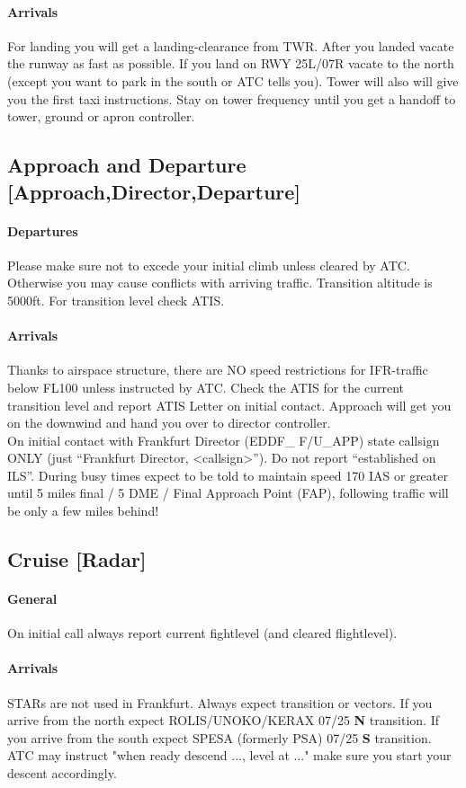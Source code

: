 \paragraph{Arrivals}
For landing you will get a landing-clearance from TWR.
After you landed vacate the runway as fast as possible.
If you land on RWY 25L/07R vacate to the north (except you want to park in the south or ATC tells you).
Tower will also will give you the first taxi instructions.
Stay on tower frequency until you get a handoff to tower, ground or apron controller.

\subsection[APP]{Approach and Departure [Approach,Director,Departure]}
\paragraph{Departures}
Please make sure not to excede your initial climb unless cleared by ATC.
Otherwise you may cause conflicts with arriving traffic.
Transition altitude is 5000ft. For transition level check ATIS.

\paragraph{Arrivals}
Thanks to airspace structure, there are NO speed restrictions for IFR-traffic below FL100 unless
instructed by ATC.
Check the ATIS for the current transition level and report ATIS Letter on initial contact.
Approach will get you on the downwind and hand you over to director controller.\\
On initial contact with Frankfurt Director (EDDF\_ F/U\_APP) state callsign ONLY (just “Frankfurt Director, <callsign>”).
Do not report “established on ILS”. During busy times expect to be told to maintain speed 170 IAS or greater until 5 miles final / 5 DME / Final Approach Point (FAP), following traffic will be only a few miles behind!

\subsection[CTR]{Cruise [Radar]}
\paragraph{General}
On initial call always report current fightlevel (and cleared flightlevel).

\paragraph{Arrivals}
STARs are not used in Frankfurt. Always expect transition or vectors.
If you arrive from the north expect ROLIS/UNOKO/KERAX 07/25 \textbf{N} transition.
If you arrive from the south expect SPESA (formerly PSA) 07/25 \textbf{S} transition.
ATC may instruct "when ready descend ..., level at ..." make sure you start your descent accordingly.
